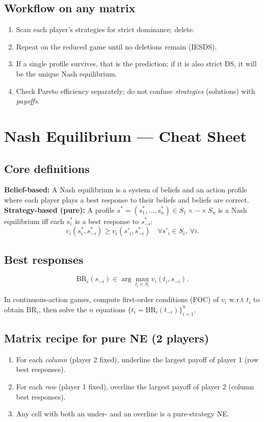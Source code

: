 \documentclass[9pt]{article}
\newcommand{\br}{\mathrm{BR}}
\begin{document}
\subsection*{Workflow on any matrix}
\begin{enumerate}[label=\arabic*)]
\item Scan each player’s strategies for strict dominance; delete.
\item Repeat on the reduced game until no deletions remain (IESDS).
\item If a single profile survives, that is the prediction; if it is also strict DS, it will be the unique Nash equilibrium.
\item Check Pareto efficiency separately; do not confuse \emph{strategies} (solutions) with \emph{payoffs}.
\end{enumerate}


\newpage
\section*{Nash Equilibrium — Cheat Sheet}

\subsection*{Core definitions}
\textbf{Belief-based:} A Nash equilibrium is a system of beliefs and an action profile where each player plays a best response to their beliefs and beliefs are correct. \\
\textbf{Strategy-based (pure):} A profile $s^*=(s_1^*,\dots,s_n^*)\in S_1\times\cdots\times S_n$ is a Nash equilibrium iff each $s_i^*$ is a best response to $s_{-i}^*$:
\[
v_i(s_i^*,s_{-i}^*) \ge v_i(s'_i,s_{-i}^*) \quad \forall s'_i\in S_i,\ \forall i.
\]

\subsection*{Best responses}
\[
\br_i(s_{-i}) \in \arg\max_{t_i\in S_i} v_i(t_i,s_{-i}).
\]

In continuous-action games, compute first-order conditions (FOC) of $v_i$ w.r.t $t_i$ to obtain $\br_i$, then solve the $n$ equations $\{t_i=\br_i(t_{-i})\}_{i=1}^n$.

\subsection*{Matrix recipe for pure NE (2 players)}
\begin{enumerate}[label=\arabic*)]
\item For each \emph{column} (player 2 fixed), underline the largest payoff of player 1 (row best responses).
\item For each \emph{row} (player 1 fixed), overline the largest payoff of player 2 (column best responses).
\item Any cell with both an under- and an overline is a pure-strategy NE.
\end{enumerate}
\end{document}

